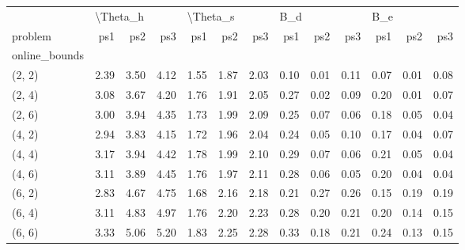 \begin{tabular}{lrrrrrrrrrrrr}
\toprule
{} & \multicolumn{3}{l}{\textbackslash Theta\_h} & \multicolumn{3}{l}{\textbackslash Theta\_s} & \multicolumn{3}{l}{B\_d} & \multicolumn{3}{l}{B\_e} \\
problem &      ps1 &  ps2 &  ps3 &      ps1 &  ps2 &  ps3 &  ps1 &  ps2 &  ps3 &  ps1 &  ps2 &  ps3 \\
online\_bounds &          &      &      &          &      &      &      &      &      &      &      &      \\
\midrule
(2, 2)        &     2.39 & 3.50 & 4.12 &     1.55 & 1.87 & 2.03 & 0.10 & 0.01 & 0.11 & 0.07 & 0.01 & 0.08 \\
(2, 4)        &     3.08 & 3.67 & 4.20 &     1.76 & 1.91 & 2.05 & 0.27 & 0.02 & 0.09 & 0.20 & 0.01 & 0.07 \\
(2, 6)        &     3.00 & 3.94 & 4.35 &     1.73 & 1.99 & 2.09 & 0.25 & 0.07 & 0.06 & 0.18 & 0.05 & 0.04 \\
(4, 2)        &     2.94 & 3.83 & 4.15 &     1.72 & 1.96 & 2.04 & 0.24 & 0.05 & 0.10 & 0.17 & 0.04 & 0.07 \\
(4, 4)        &     3.17 & 3.94 & 4.42 &     1.78 & 1.99 & 2.10 & 0.29 & 0.07 & 0.06 & 0.21 & 0.05 & 0.04 \\
(4, 6)        &     3.11 & 3.89 & 4.45 &     1.76 & 1.97 & 2.11 & 0.28 & 0.06 & 0.05 & 0.20 & 0.04 & 0.04 \\
(6, 2)        &     2.83 & 4.67 & 4.75 &     1.68 & 2.16 & 2.18 & 0.21 & 0.27 & 0.26 & 0.15 & 0.19 & 0.19 \\
(6, 4)        &     3.11 & 4.83 & 4.97 &     1.76 & 2.20 & 2.23 & 0.28 & 0.20 & 0.21 & 0.20 & 0.14 & 0.15 \\
(6, 6)        &     3.33 & 5.06 & 5.20 &     1.83 & 2.25 & 2.28 & 0.33 & 0.18 & 0.21 & 0.24 & 0.13 & 0.15 \\
\bottomrule
\end{tabular}
